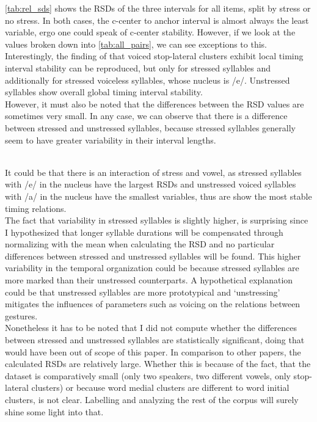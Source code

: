 \documentclass[../Proposal.tex]{subfiles}
\begin{document}
\cref{tab:rel_sds} shows the RSDs of the three intervals for all items, split by stress or no stress. In both cases, the c-center to anchor interval is almost always the least variable, ergo one could speak of c-center stability. However, if we look at the values broken down into \cref{tab:all_pairs}, we can see exceptions to this. Interestingly, the finding of \cite[]{sotiropoulou2020global} that voiced stop-lateral clusters exhibit local timing interval stability can be reproduced, but only for stressed syllables and additionally for stressed voiceless syllables, whose nucleus is /e/. Unstressed syllables show overall global timing interval stability.
\\
However, it must also be noted that the differences between the RSD values are sometimes very small. In any case, we can observe that there is a difference between stressed and unstressed syllables, because stressed syllables generally seem to have greater variability in their interval lengths. 


\\
It could be that there is an interaction of stress and vowel, as stressed syllables with /e/ in the nucleus have the largest RSDs and unstressed voiced syllables with /a/ in the nucleus have the smallest variables, thus are show the most stable timing relations.\\

The fact that variability in stressed syllables is slightly higher, is surprising since I hypothesized that longer syllable durations will be compensated through normalizing with the mean when calculating the RSD and no particular differences between stressed and unstressed syllables will be found. 
This higher variability in the temporal organization could be because stressed syllables are more marked than their unstressed counterparts. A hypothetical explanation could be that unstressed syllables are more prototypical and `unstressing' mitigates the influences of parameters such as voicing on the relations between gestures.\\
Nonetheless it has to be noted that I did not compute whether the differences between stressed and unstressed syllables are statistically significant, doing that would have been out of scope of this paper. 
In comparison to other papers, the calculated RSDs are relatively large. Whether this is because of the fact, that the dataset is comparatively small (only two speakers, two different vowels, only stop-lateral clusters) or because word medial clusters are different to word initial clusters, is not clear. Labelling and analyzing the rest of the corpus will surely shine some light into that.
\end{document}

